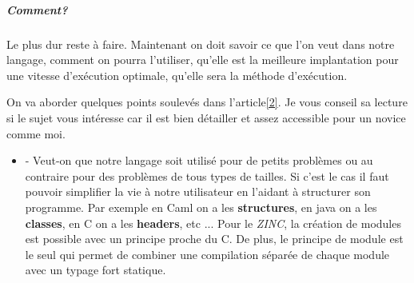 \documentclass[10pt,a4paper]{article}
\begin{document}
				\subparagraph{Comment?}	
				Le plus dur reste à faire. Maintenant on doit savoir ce que l'on veut dans notre langage, comment on pourra l'utiliser, qu'elle est la meilleure implantation pour une vitesse d'exécution optimale, qu'elle sera la méthode d'exécution. 
				\medbreak
				
				On va aborder quelques points soulevés dans l'article\hyperref[ZINC]{[2]}. Je vous conseil sa lecture si le sujet vous intéresse car il est bien détailler et assez accessible pour un novice comme moi.
				\begin{itemize}
					\item[] - Veut-on que notre langage soit utilisé pour de petits problèmes ou au contraire pour des problèmes de tous types de tailles. Si c'est le cas il faut pouvoir simplifier la vie à notre utilisateur en l'aidant à structurer son programme. Par exemple en Caml on a les \textbf{structures}, en java on a les \textbf{classes}, en C on a les \textbf{headers}, etc ... Pour le \textit{ZINC}, la création de modules est possible avec un principe proche du C. De plus, le principe de module est le seul qui permet de combiner une compilation séparée de chaque module avec un typage fort statique.
					\medbreak
					

\end{itemize}
\end{document}
